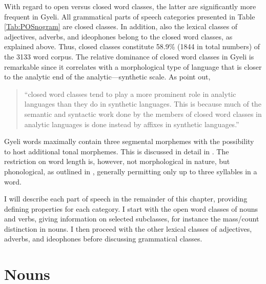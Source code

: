 With regard to open versus closed word classes, the latter are significantly more frequent in Gyeli. All grammatical parts of speech categories presented in Table \ref{Tab:POSnogram} 
are closed classes. In addition, also the lexical classes of adjectives, adverbs, and ideophones belong to the closed word classes, as explained above. Thus, closed classes constitute 58.9\% (1844 in total numbers) of the 3133 word corpus.
The relative dominance of closed word classes in Gyeli is remarkable since it correlates with a morphological type of language that is closer to the analytic end of the analytic---synthetic scale. As \citet[23]{schachter2007} point out,
\begin{quote} ``closed word classes tend to play a more prominent role in analytic languages than they do in synthetic languages. This is because much of the semantic and syntactic work done by the members of closed word classes in analytic languages is done instead by affixes in synthetic languages.''
\end{quote} 
Gyeli words maximally contain three segmental morphemes with the possibility to host additional tonal morphemes. This is discussed in detail in . The restriction on word length is, however, not morphological in nature, but phonological, as outlined in , generally permitting only up to three syllables in a word.

I will describe each part of speech in the remainder of this chapter, providing defining properties for each category. I start with the open word classes of nouns and verbs, giving information on selected subclasses, for instance the mass/count distinction in nouns. I then proceed with the other lexical classes of adjectives, adverbs, and ideophones before discussing grammatical classes.







	
	

\section{Nouns}
\label{sec:N}



